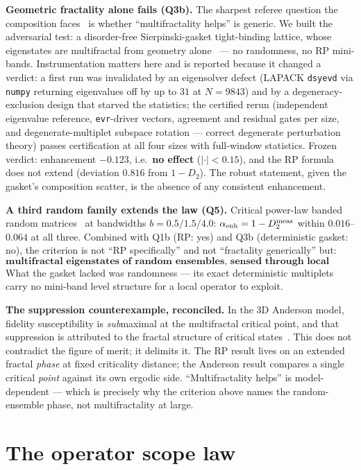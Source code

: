 \documentclass[11pt]{article}
\begin{document}
\textbf{Geometric fractality alone fails (Q3b).} The sharpest referee question the composition
faces~\cite{sak2022,tokarczyk2026} is whether ``multifractality helps'' is generic. We built the
adversarial test: a disorder-free Sierpinski-gasket tight-binding lattice, whose eigenstates are
multifractal from geometry alone~\cite{sierpinski2025} --- no randomness, no RP mini-bands.
Instrumentation matters here and is reported because it changed a verdict: a first run was
invalidated by an eigensolver defect (LAPACK \texttt{dsyevd} via \texttt{numpy} returning
eigenvalues off by up to $31$ at $N=9843$) and by a degeneracy-exclusion design that starved the
statistics; the certified rerun (independent eigenvalue reference, \texttt{evr}-driver vectors,
agreement and residual gates per size, and degenerate-multiplet subspace rotation --- correct
degenerate perturbation theory) passes certification at all four sizes with full-window statistics.
Frozen verdict: enhancement $-0.123$, i.e.\ \textbf{no effect} ($|{\cdot}|<0.15$), and the RP
formula does not extend (deviation $0.816$ from $1-D_2$). The robust statement, given the gasket's
composition scatter, is the absence of any consistent enhancement.

\textbf{A third random family extends the law (Q5).} Critical power-law banded random
matrices~\cite{mirlin1996} at bandwidths $b = 0.5/1.5/4.0$: $\alpha_{\rm enh} = 1-D_2^{\rm meas}$
within $0.016$--$0.064$ at all three. Combined with Q1b (RP: yes) and Q3b (deterministic gasket:
no), the criterion is not ``RP specifically'' and not ``fractality generically'' but:
\[
\textbf{multifractal eigenstates of random ensembles, sensed through local couplings.}
\]
What the gasket lacked was randomness --- its exact deterministic multiplets carry no mini-band
level structure for a local operator to exploit.

\textbf{The suppression counterexample, reconciled.} In the 3D Anderson model, fidelity
susceptibility is \emph{sub}maximal at the multifractal critical point, and that suppression is
attributed to the fractal structure of critical states~\cite{tokarczyk2026}. This does not
contradict the figure of merit; it delimits it. The RP result lives on an extended fractal
\emph{phase} at fixed criticality distance; the Anderson result compares a single critical
\emph{point} against its own ergodic side. ``Multifractality helps'' is model-dependent --- which
is precisely why the criterion above names the random-ensemble phase, not multifractality at
large.

\section{The operator scope law}
\label{sec:q4}
\end{document}
